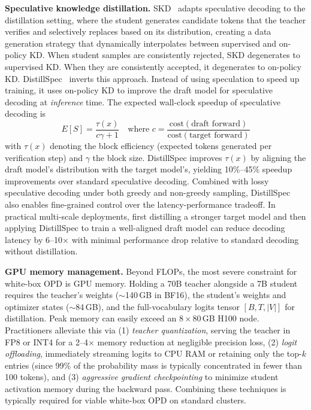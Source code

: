 \documentclass{article} %
\begin{document}
\textbf{Speculative knowledge distillation.} SKD~\citep{2410.11325} adapts speculative decoding to the distillation setting, where the student generates candidate tokens that the teacher verifies and selectively replaces based on its distribution, creating a data generation strategy that dynamically interpolates between supervised and on-policy KD. When student samples are consistently rejected, SKD degenerates to supervised KD. When they are consistently accepted, it degenerates to on-policy KD. DistillSpec~\citep{2310.08461} inverts this approach. Instead of using speculation to speed up training, it uses on-policy KD to improve the draft model for speculative decoding at \emph{inference} time. The expected wall-clock speedup of speculative decoding is
\begin{equation}
    E[S] = \frac{\tau(x)}{c\gamma + 1} \quad \text{where } c = \frac{\text{cost}(\text{draft forward})}{\text{cost}(\text{target forward})}
\end{equation}
with $\tau(x)$ denoting the block efficiency (expected tokens generated per verification step) and $\gamma$ the block size. DistillSpec improves $\tau(x)$ by aligning the draft model's distribution with the target model's, yielding 10\%--45\% speedup improvements over standard speculative decoding. Combined with lossy speculative decoding under both greedy and non-greedy sampling, DistillSpec also enables fine-grained control over the latency-performance tradeoff. In practical multi-scale deployments, first distilling a stronger target model and then applying DistillSpec to train a well-aligned draft model can reduce decoding latency by 6--10$\times$ with minimal performance drop relative to standard decoding without distillation.

\textbf{GPU memory management.} Beyond FLOPs, the most severe constraint for white-box OPD is GPU memory. Holding a 70B teacher alongside a 7B student requires the teacher's weights ($\sim$140\,GB in BF16), the student's weights and optimizer states ($\sim$84\,GB), and the full-vocabulary logits tensor $[B, T, |V|]$ for distillation. Peak memory can easily exceed an $8\times80$\,GB H100 node. Practitioners alleviate this via (1) \textit{teacher quantization}, serving the teacher in FP8 or INT4 for a 2--4$\times$ memory reduction at negligible precision loss, (2) \textit{logit offloading}, immediately streaming logits to CPU RAM or retaining only the top-$k$ entries (since 99\% of the probability mass is typically concentrated in fewer than 100 tokens), and (3) \textit{aggressive gradient checkpointing} to minimize student activation memory during the backward pass. Combining these techniques is typically required for viable white-box OPD on standard clusters.
\end{document}
